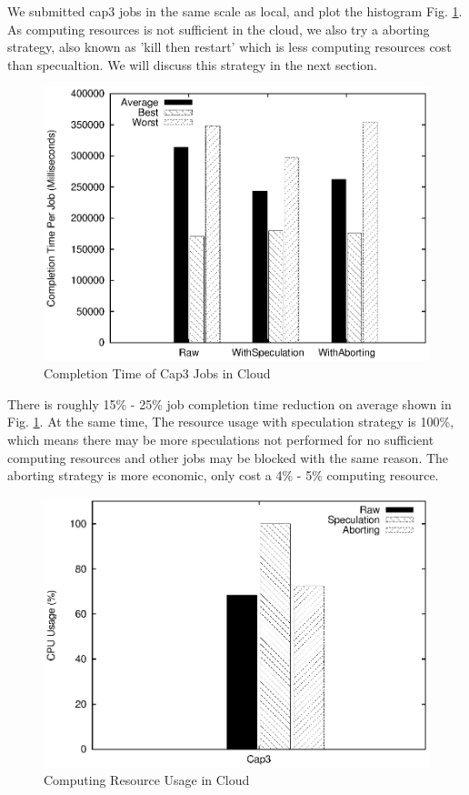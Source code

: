We submitted cap3 jobs in the same scale as local, and plot the histogram Fig. \ref{figure:completiontime_cap3_cloud}. As computing resources is not sufficient in the cloud, we also try a aborting strategy, also known as 'kill then restart' which is less computing resources cost than specualtion. We will discuss this strategy in the next section.

\begin{figure}
\centering
\includegraphics[width=0.9\columnwidth]{figures/cloud_completiontime_cap3.eps}
\caption{Completion Time of Cap3 Jobs in Cloud}
\label{figure:completiontime_cap3_cloud}
\end{figure}

There is roughly 15\% - 25\% job completion time reduction on average shown in Fig. \ref{figure:completiontime_cap3_cloud}. At the same time, The resource usage with speculation strategy is 100\%, which means there may be more speculations not performed for no sufficient computing resources and other jobs may be blocked with the same reason. The aborting strategy is more economic, only cost a 4\% - 5\% computing resource.

\begin{figure}
\centering
\includegraphics[width=0.9\columnwidth]{figures/cloud_resource_usage.eps}
\caption{Computing Resource Usage in Cloud}
\label{figure:resourceusage_cloud}
\end{figure}

